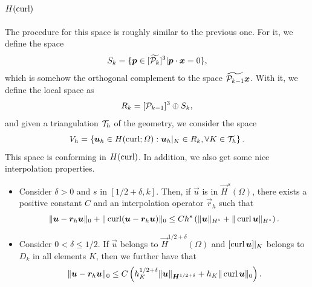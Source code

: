 \paragraph{\texorpdfstring{$H(\curl)$}{H(curl)}} The procedure for this space is roughly similar to the previous one. For it, we define the space
\begin{equation}
    S_k = \{ \vec p \in [\widetilde{\P_k}]^3 | \vec p \cdot \vec x = 0 \},
\end{equation}
which is somehow the orthogonal complement to the space $\widetilde{\P_{k-1}}\vec x$. With it, we define the local space as 
\begin{equation}
    R_k = [\P_{k-1}]^3\oplus S_k,
\end{equation}
and given a triangulation $\T_h$ of the geometry, we consider the space
\begin{equation}
    V_h = \left\{ \vec u_h \in H(\curl;\Omega): \vec u_h|_K \in R_k, \forall K\in \T_h\right\}.
\end{equation}
This space is conforming in $H(\curl)$. In addition, we also get some nice interpolation properties. 
\begin{theorem} \phantom{.}
    \begin{itemize}
        \item Consider $\delta>0$ and $s$ in $[1/2+\delta, k]$. Then, if $\vec u$ is in $\vec H^s(\Omega)$, there exists a positive constant $C$ and an interpolation operator $\vec r_h$ such that 
        \begin{equation}
            \| \vec u - \vec r_h \vec u\|_0 + \| \curl(\vec u - \vec r_h \vec u) \|_0 \leq C h^s \left(\| \vec u\|_{H^s} + \| \curl \vec u \|_{H^s}\right) .
        \end{equation}
        \item Consider $0<\delta\leq 1/2$. If $\vec u$ belongs to $\vec H^{1/2+\delta}(\Omega)$ and $[\curl \vec u]|_K$ belongs to $D_k$ in all elements $K$, then we further have that
        \begin{equation}
            \|\vec u - \vec r_h \vec u\|_0 \leq C\left(h_K^{1/2+\delta} \| \vec u\|_{\vec H^{1/2+\delta}} + h_K \| \curl \vec u\|_0 \right).
        \end{equation}
    \end{itemize}
\end{theorem}
